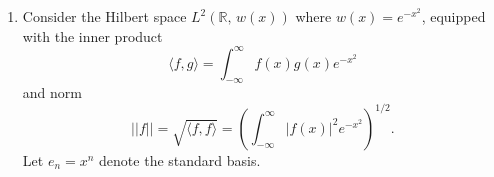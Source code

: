 \documentclass{article}
\begin{document}
{{\begin{enumerate}
\\$q_1=\frac{v_1}{\sqrt{2}}\in\textrm{Span}\{v_1\}$, $q_2=\frac{v_2-v_1}{\sqrt{3}}\in\textrm{Span}\{v_1,v_2\}$
\\$v_1=\sqrt{2}q_1$, $v_2=v_1+(v_2-v_1)=\sqrt{2}q_1+\sqrt{3}q_2$
\\so $v_1, v_2\in\textrm{Span}\{q_1,q_2\}$
\\$\textrm{Span}\{\bm{v}_1,\bm{v}_2\}= \textrm{Span}\{\bm{q}_1,\bm{q}_2\}$

\newpage\item Consider the Hilbert space $L^2(\mathbb{R},\,w(x))$ where $w(x)=e^{-x^2}$, equipped with the inner product
$$\langle f,g \rangle=\displaystyle{\int^{\infty}_{-\infty}{f(x)g(x)e^{-x^2}}}$$
and norm
$$||f||=\sqrt{\langle f,f \rangle}=\left(\displaystyle{\int^{\infty}_{-\infty}{|f(x)|^2e^{-x^2}}}\right)^{1/2}.$$
Let $e_n=x^n$ denote the standard basis.

\begin{enumerate}[a.]


\end{enumerate}
\end{enumerate}}}
\end{document}
